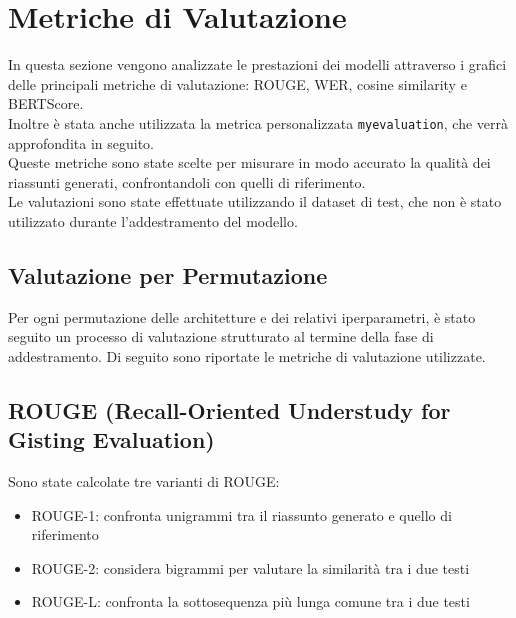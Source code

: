 \section{Metriche di Valutazione}
In questa sezione vengono analizzate le prestazioni dei modelli attraverso i grafici delle principali metriche di valutazione: ROUGE, WER, cosine similarity e BERTScore.\\
Inoltre è stata anche utilizzata la metrica personalizzata \texttt{myevaluation}, che verrà approfondita in seguito.\\
Queste metriche sono state scelte per misurare in modo accurato la qualit\`a dei riassunti generati, confrontandoli con quelli di riferimento.\\
Le valutazioni sono state effettuate utilizzando il dataset di test, che non \`e stato utilizzato durante l'addestramento del modello.\\

\subsection{Valutazione per Permutazione}
Per ogni permutazione delle architetture e dei relativi iperparametri,
è stato seguito un processo di valutazione strutturato al termine della
fase di addestramento. Di seguito sono riportate le metriche di valutazione utilizzate.

\subsection{ROUGE (Recall-Oriented Understudy for Gisting Evaluation)}
Sono state calcolate tre varianti di ROUGE:
\begin{itemize}
    \item ROUGE-1: confronta unigrammi tra il riassunto generato e quello di riferimento
    \item ROUGE-2: considera bigrammi per valutare la similarit\`a tra i due testi
    \item ROUGE-L: confronta la sottosequenza pi\`u lunga comune tra i due testi
\end{itemize}

